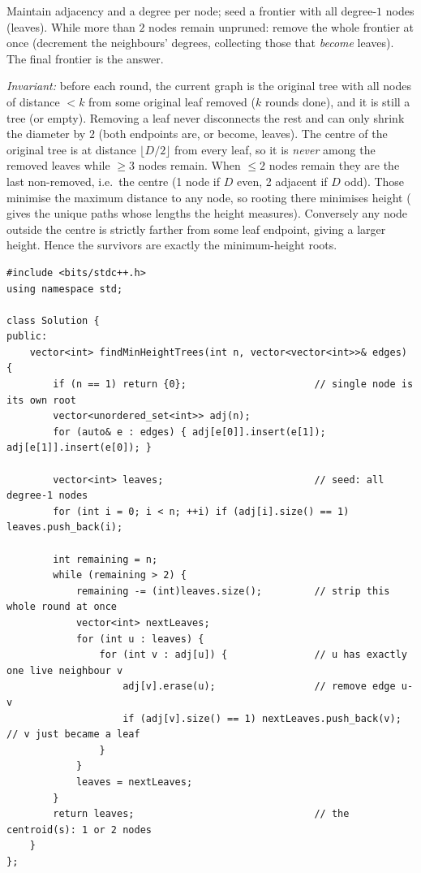 Maintain adjacency and a degree per node; seed a frontier with all degree-$1$ nodes (leaves).
While more than $2$ nodes remain unpruned: remove the whole frontier at once (decrement the
neighbours' degrees, collecting those that \emph{become} leaves). The final frontier is the
answer.

\begin{proofbox}
\emph{Invariant:} before each round, the current graph is the original tree with all nodes of
distance $<k$ from some original leaf removed ($k$ rounds done), and it is still a tree (or
empty). Removing a leaf never disconnects the rest and can only shrink the diameter by $2$
(both endpoints are, or become, leaves). The centre of the original tree is at distance
$\lfloor D/2\rfloor$ from every leaf, so it is \emph{never} among the removed leaves while
$\ge3$ nodes remain. When $\le2$ nodes remain they are the last non-removed, i.e.\ the centre
(1 node if $D$ even, 2 adjacent if $D$ odd). Those minimise the maximum distance to any node,
so rooting there minimises height ( gives the unique paths whose
lengths the height measures). Conversely any node outside the centre is strictly farther from
some leaf endpoint, giving a larger height. Hence the survivors are exactly the minimum-height
roots.
\end{proofbox}

\begin{lstlisting}[caption={Minimum Height Trees via leaf peeling (LeetCode 310)}, label={lst:c04-min-height}]
#include <bits/stdc++.h>
using namespace std;

class Solution {
public:
    vector<int> findMinHeightTrees(int n, vector<vector<int>>& edges) {
        if (n == 1) return {0};                      // single node is its own root
        vector<unordered_set<int>> adj(n);
        for (auto& e : edges) { adj[e[0]].insert(e[1]); adj[e[1]].insert(e[0]); }

        vector<int> leaves;                          // seed: all degree-1 nodes
        for (int i = 0; i < n; ++i) if (adj[i].size() == 1) leaves.push_back(i);

        int remaining = n;
        while (remaining > 2) {
            remaining -= (int)leaves.size();         // strip this whole round at once
            vector<int> nextLeaves;
            for (int u : leaves) {
                for (int v : adj[u]) {               // u has exactly one live neighbour v
                    adj[v].erase(u);                 // remove edge u-v
                    if (adj[v].size() == 1) nextLeaves.push_back(v);   // v just became a leaf
                }
            }
            leaves = nextLeaves;
        }
        return leaves;                               // the centroid(s): 1 or 2 nodes
    }
};
\end{lstlisting}

